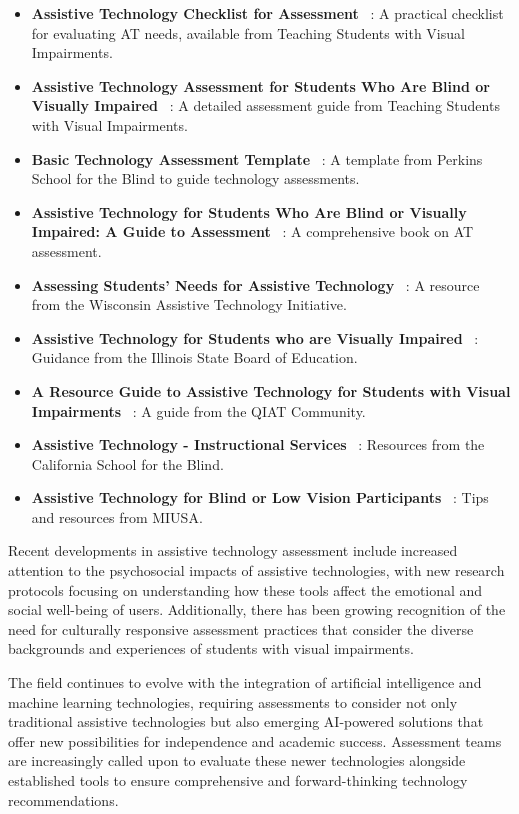 \begin{itemize}
  \item \textbf{Assistive Technology Checklist for Assessment}~ \cite{SnowChecklist}: A practical checklist for evaluating AT needs, available from Teaching Students with Visual Impairments.
  \item \textbf{Assistive Technology Assessment for Students Who Are Blind or Visually Impaired}~ \cite{TeachingAssessment}: A detailed assessment guide from Teaching Students with Visual Impairments.
  \item \textbf{Basic Technology Assessment Template}~ \cite{PerkinsTemplate}: A template from Perkins School for the Blind to guide technology assessments.
  \item \textbf{Assistive Technology for Students Who Are Blind or Visually Impaired: A Guide to Assessment}~ \cite{PresleyGuide}: A comprehensive book on AT assessment.
  \item \textbf{Assessing Students' Needs for Assistive Technology}~ \cite{WATIAssessing}: A resource from the Wisconsin Assistive Technology Initiative.
  \item \textbf{Assistive Technology for Students who are Visually Impaired}~ \cite{ISBEAssistive}: Guidance from the Illinois State Board of Education.
  \item \textbf{A Resource Guide to Assistive Technology for Students with Visual Impairments}~ \cite{QIATGuide}: A guide from the QIAT Community.
  \item \textbf{Assistive Technology - Instructional Services}~ \cite{CSBInstruction}: Resources from the California School for the Blind.
  \item \textbf{Assistive Technology for Blind or Low Vision Participants}~ \cite{MIUSATips}: Tips and resources from MIUSA.
\end{itemize}

Recent developments in assistive technology assessment include increased attention to the psychosocial impacts of assistive technologies, with new research protocols focusing on understanding how these tools affect the emotional and social well-being of users. Additionally, there has been growing recognition of the need for culturally responsive assessment practices that consider the diverse backgrounds and experiences of students with visual impairments.

The field continues to evolve with the integration of artificial intelligence and machine learning technologies, requiring assessments to consider not only traditional assistive technologies but also emerging AI-powered solutions that offer new possibilities for independence and academic success. Assessment teams are increasingly called upon to evaluate these newer technologies alongside established tools to ensure comprehensive and forward-thinking technology recommendations.

